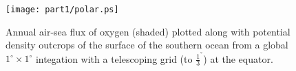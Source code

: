 \begin{figure}
\begin{center}
   \texttt{[image: part1/polar.ps]}
\end{center}
\caption{Annual air-sea flux of oxygen (shaded) plotted along with
potential density outcrops of the surface of the southern ocean from a
global $1^{\circ}\times 1^{\circ}$ integation with a telescoping
grid (to $\frac{1}{3}^{^\circ}$) at the equator.}
\label{fig:biogeo}
\end{figure}
